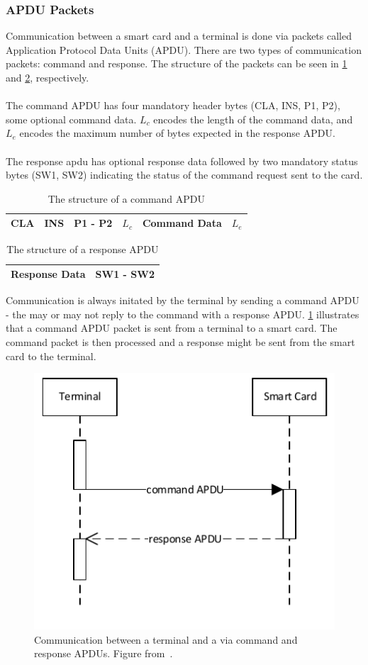 \subsubsection{APDU Packets}\label{subsec:apdu}
Communication between a smart card and a terminal is done via packets called Application Protocol Data Units (APDU). There are two types of communication packets: command and response. The structure of the packets can be seen in \cref{tab:apduCommand} and \cref{tab:apduResponse}, respectively.\\\\
The command APDU has four mandatory header bytes (CLA, INS, P1, P2), some optional command data. $L_{c}$ encodes the length of the command data, and $L_{e}$ encodes the maximum number of bytes expected in the response APDU.\\\\
The response apdu has optional response data followed by two mandatory status bytes (SW1, SW2) indicating the status of the command request sent to the card.

\begin{table}[H]
	\centering
    \begin{tabular}{|l|l|l|l|l|l|}
    \hline
    CLA & INS & P1 - P2 & $L_{c}$ & Command Data & $L_{e}$ \\ \hline
    \end{tabular}
    \caption{The structure of a command APDU}
    \label{tab:apduCommand}
\end{table}

\begin{table}[H]
	\centering
    \begin{tabular}{|l|l|}
    \hline
    Response Data & SW1 - SW2 \\ \hline
    \end{tabular}
    \caption{The structure of a response APDU}
    \label{tab:apduResponse}
\end{table}

Communication is always initated by the terminal by sending a command APDU - the \jc may or may not reply to the command with a response APDU. \cref{fig:apdu} illustrates that a command APDU packet is sent from a terminal to a smart card. The command packet is then processed and a response might be sent from the smart card to the terminal.
 
\begin{figure}[H]
  \centering
  \includegraphics[scale=1, trim=0cm 0cm 0cm 0cm]{figures/apdu}
  \caption{Communication between a terminal and a \jc via command and response APDUs. Figure from~\cite[p. 4]{javasec}.}
  \label{fig:apdu}
\end{figure}